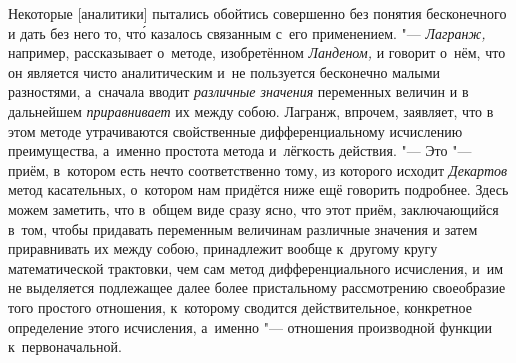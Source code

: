 Некоторые [аналитики] пытались обойтись совершенно без понятия бесконечного и
дать без него то, чт\'{о} казалось связанным с~его применением. "---
{\em Лагранж,} например, рассказывает о~методе, изобретённом {\em Ланденом,} и
говорит о~нём, что он является чисто аналитическим и~не пользуется бесконечно
малыми разностями, а~сначала вводит {\em различные значения} переменных величин и
в дальнейшем {\em приравнивает} их между собою. Лагранж, впрочем, заявляет, что
в этом методе утрачиваются свойственные дифференциальному исчислению
преимущества, а~именно простота метода и~лёгкость действия. "--- Это "---
приём, в~котором есть нечто соответственно тому, из которого исходит
{\em Декартов} метод касательных, о~котором нам придётся ниже ещё говорить
подробнее. Здесь можем заметить, что в~общем виде сразу ясно, что этот приём,
заключающийся в~том, чтобы придавать переменным величинам различные значения и
затем приравнивать их между собою, принадлежит вообще к~другому кругу
математической трактовки, чем сам метод дифференциального исчисления, и~им не
выделяется подлежащее далее более пристальному рассмотрению своеобразие того
простого отношения, к~которому сводится действительное, конкретное определение
этого исчисления, а~именно "--- отношения производной функции к~первоначальной.

